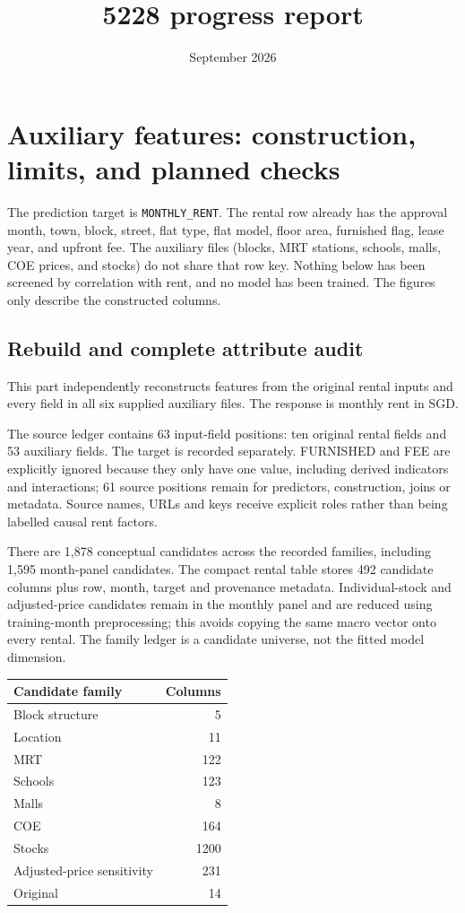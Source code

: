 \documentclass[10pt]{article}
\title{5228 progress report}
\date{September 2026}
\begin{document}
\maketitle

\section{Auxiliary features: construction, limits, and planned checks}
\label{sec:auxiliary}

The prediction target is \texttt{MONTHLY\_RENT}.
The rental row already has the approval month, town, block, street, flat type, flat model, floor area, furnished flag, lease year, and upfront fee.
The auxiliary files (blocks, MRT stations, schools, malls, COE prices, and stocks) do not share that row key.
Nothing below has been screened by correlation with rent, and no model has been trained.
The figures only describe the constructed columns.

\subsection{Rebuild and complete attribute audit}
\label{sec:rebuild}

This part independently reconstructs features from the original rental inputs and every field in all six supplied auxiliary files. The response is monthly rent in SGD.

The source ledger contains 63 input-field positions: ten original rental fields and 53 auxiliary fields. The target is recorded separately. FURNISHED and FEE are explicitly ignored because they only have one value, including derived indicators and interactions; 61 source positions remain for predictors, construction, joins or metadata. Source names, URLs and keys receive explicit roles rather than being labelled causal rent factors.

There are 1,878 conceptual candidates across the recorded families, including 1,595 month-panel candidates. The compact rental table stores 492 candidate columns plus row, month, target and provenance metadata. Individual-stock and adjusted-price candidates remain in the monthly panel and are reduced using training-month preprocessing; this avoids copying the same macro vector onto every rental. The family ledger is a candidate universe, not the fitted model dimension.

\begin{center}
\small
\begin{tabular}{lr}
\toprule
Candidate family & Columns \\
\midrule
Block structure & 5 \\
Location & 11 \\
MRT & 122 \\
Schools & 123 \\
Malls & 8 \\
COE & 164 \\
Stocks & 1200 \\
Adjusted-price sensitivity & 231 \\
Original & 14 \\
\bottomrule
\end{tabular}
\end{center}
\end{document}
